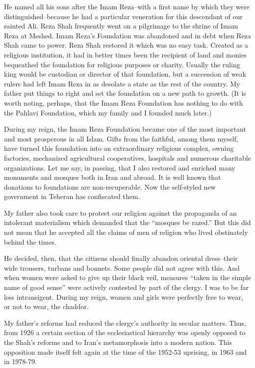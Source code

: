He named all his sons after the Imam Reza--with a first name by which they were distinguished--because he had a particular veneration for this descendant of our sainted Ali. Reza Shah frequently went on a pilgrimage to the shrine of Imam Reza at Meshed. Imam Reza’s Foundation was abandoned and in debt when Reza Shah came to power. Reza Shah restored it which was no easy task. Created as a religious institution, it had in better times been the recipient of land and monies bequeathed the foundation for religious purposes or charity. Usually the ruling king would be custodian or director of that foundation, but a succession of weak rulers had left Imam Reza in as desolate a state as the rest of the country. My father put things to right and set the foundation on a new path to growth. (It is worth noting, perhaps, that the Imam Reza Foundation has nothing to do with the Pahlavi Foundation, which my family and I founded much later.) 

During my reign, the Imam Reza Foundation became one of the most important and most prosperous in all Islam. Gifts from the faithful, among them myself, have turned this foundation into an extraordinary religious complex, owning factories, mechanized agricultural cooperatives, hospitals and numerous charitable organizations. Let me say, in passing, that I also restored and enriched many monuments and mosques both in Iran and abroad. It is well known that donations to foundations are non-recuperable. Now the self-styled new government in Teheran has confiscated them. 

My father also took care to protect our religion against the propaganda of an intolerant materialism which demanded that the “mosques be razed.” But this did not mean that he accepted all the claims of men of religion who lived obstinately behind the times. 

He decided, then, that the citizens should finally abandon oriental dress--their wide trousers, turbans and bonnets. Some people did not agree with this. And when women were asked to give up their black veil, measures “taken in the simple name of good sense” were actively contested by part of the clergy. I was to be far less intransigent. During my reign, women and girls were perfectly free to wear, or not to wear, the chaddor. 

My father's reforms had reduced the clergy’s authority in secular matters. Thus, from 1926 a certain section of the ecclesiastical hierarchy was openly opposed to the Shah's reforms and to Iran’s metamorphosis into a modern nation. This opposition made itself felt again at the time of the 1952-53 uprising, in 1963 and in 1978-79. 



